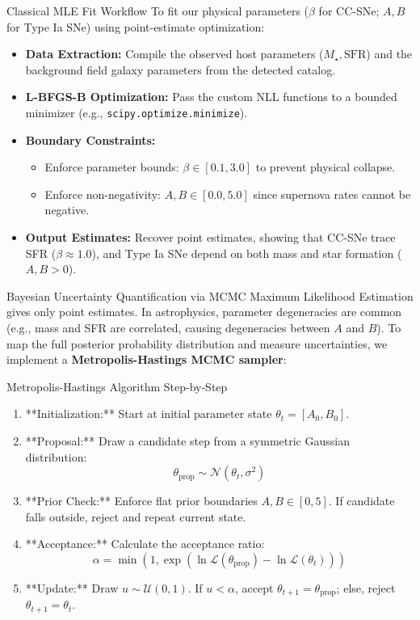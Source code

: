 \documentclass[9pt]{beamer}
\begin{document}
\begin{frame}{Classical MLE Fit Workflow}
  To fit our physical parameters ($\beta$ for CC-SNe; $A, B$ for Type Ia SNe) using point-estimate optimization:
  \begin{itemize}
    \item \textbf{Data Extraction:} Compile the observed host parameters ($M_\star, \text{SFR}$) and the background field galaxy parameters from the detected catalog.
    \item \textbf{L-BFGS-B Optimization:} Pass the custom NLL functions to a bounded minimizer (e.g., \texttt{scipy.optimize.minimize}).
    \item \textbf{Boundary Constraints:}
      \begin{itemize}
        \item Enforce parameter bounds: $\beta \in [0.1, 3.0]$ to prevent physical collapse.
        \item Enforce non-negativity: $A, B \in [0.0, 5.0]$ since supernova rates cannot be negative.
      \end{itemize}
    \item \textbf{Output Estimates:} Recover point estimates, showing that CC-SNe trace SFR ($\beta \approx 1.0$), and Type Ia SNe depend on both mass and star formation ($A, B > 0$).
  \end{itemize}
\end{frame}

\begin{frame}{Bayesian Uncertainty Quantification via MCMC}
  Maximum Likelihood Estimation gives only point estimates. In astrophysics, parameter degeneracies are common (e.g., mass and SFR are correlated, causing degeneracies between $A$ and $B$).
  To map the full posterior probability distribution and measure uncertainties, we implement a \textbf{Metropolis-Hastings MCMC sampler}:
  \begin{block}{Metropolis-Hastings Algorithm Step-by-Step}
    \begin{enumerate}
      \item **Initialization:** Start at initial parameter state $\theta_t = [A_0, B_0]$.
      \item **Proposal:** Draw a candidate step from a symmetric Gaussian distribution:
        $$\theta_{\text{prop}} \sim \mathcal{N}(\theta_t, \sigma^2)$$
      \item **Prior Check:** Enforce flat prior boundaries $A, B \in [0, 5]$. If candidate falls outside, reject and repeat current state.
      \item **Acceptance:** Calculate the acceptance ratio:
        $$\alpha = \min\left(1, \exp(\ln \mathcal{L}(\theta_{\text{prop}}) - \ln \mathcal{L}(\theta_t))\right)$$
      \item **Update:** Draw $u \sim \mathcal{U}(0, 1)$. If $u < \alpha$, accept $\theta_{t+1} = \theta_{\text{prop}}$; else, reject $\theta_{t+1} = \theta_t$.
    \end{enumerate}
  \end{block}
\end{frame}
\end{document}
